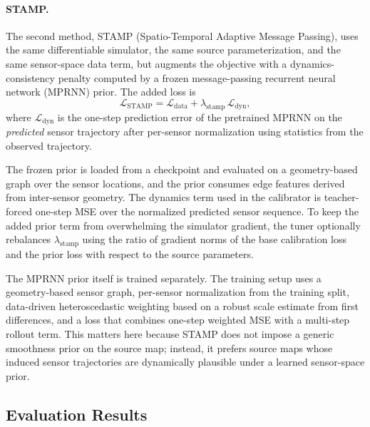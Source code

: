 \paragraph{STAMP.}
The second method, STAMP (Spatio-Temporal Adaptive Message Passing), uses the same differentiable simulator, the same source parameterization, and the same sensor-space data term, but augments the objective with a dynamics-consistency penalty computed by a frozen message-passing recurrent neural network (MPRNN) prior. The added loss is
\begin{equation}
\mathcal{L}_{\mathrm{STAMP}} = \mathcal{L}_{\mathrm{data}} + \lambda_{\mathrm{stamp}}\,\mathcal{L}_{\mathrm{dyn}}, \nonumber
\end{equation}
where $\mathcal{L}_{\mathrm{dyn}}$ is the one-step prediction error of the pretrained MPRNN \citep{iyer2020forecasting,iyer2022modeling} on the \emph{predicted} sensor trajectory after per-sensor normalization using statistics from the observed trajectory.

The frozen prior is loaded from a checkpoint and evaluated on a geometry-based graph over the sensor locations, and the prior consumes edge features derived from inter-sensor geometry. The dynamics term used in the calibrator is teacher-forced one-step MSE over the normalized predicted sensor sequence. To keep the added prior term from overwhelming the simulator gradient, the tuner optionally rebalances $\lambda_{\mathrm{stamp}}$ using the ratio of gradient norms of the base calibration loss and the prior loss with respect to the source parameters.

The MPRNN prior itself is trained separately. The training setup uses a geometry-based sensor graph, per-sensor normalization from the training split, data-driven heteroscedastic weighting based on a robust scale estimate from first differences, and a loss that combines one-step weighted MSE with a multi-step rollout term. This matters here because STAMP does not impose a generic smoothness prior on the source map; instead, it prefers source maps whose induced sensor trajectories are dynamically plausible under a learned sensor-space prior.

\subsection{Evaluation Results}
\label{subsec:evaluation_protocol}

